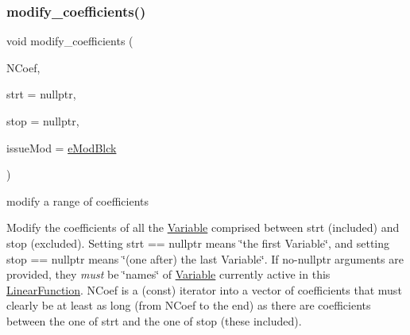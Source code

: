 \subsubsection{\texorpdfstring{modify\+\_\+coefficients()}{modify\_coefficients()}\hspace{0.1cm}{\footnotesize\ttfamily [4/4]}}
{\footnotesize\ttfamily void modify\+\_\+coefficients (\begin{DoxyParamCaption}\item[{\mbox{\hyperlink{class_s_m_spp__di__unipi__it_1_1_linear_function_a9e665512d3a7f7aae5031e99c675cc11}{c\+\_\+v\+\_\+coeff\+\_\+it}}}]{N\+Coef,  }\item[{const \mbox{\hyperlink{class_s_m_spp__di__unipi__it_1_1_variable}{Variable}} $\ast$}]{strt = {\ttfamily nullptr},  }\item[{const \mbox{\hyperlink{class_s_m_spp__di__unipi__it_1_1_variable}{Variable}} $\ast$}]{stop = {\ttfamily nullptr},  }\item[{\mbox{\hyperlink{group___modification___t_y_p_e_s_ga544246d8c462e9a2d817c2c30797968f}{c\+\_\+\+Mod\+Param}}}]{issue\+Mod = {\ttfamily \mbox{\hyperlink{group___modification___t_y_p_e_s_gga48fddcdd03a03f49b7e389ca1ed938d4a21b14b26b1c0093a0905f6fc010bad29}{e\+Mod\+Blck}}} }\end{DoxyParamCaption})\hspace{0.3cm}{\ttfamily [inline]}}



modify a range of coefficients 

Modify the coefficients of all the \mbox{\hyperlink{class_s_m_spp__di__unipi__it_1_1_variable}{Variable}} comprised between strt (included) and stop (excluded). Setting strt == nullptr means \char`\"{}the first
\+Variable\char`\"{}, and setting stop == nullptr means \char`\"{}(one after) the last
\+Variable\char`\"{}. If no-\/nullptr arguments are provided, they {\itshape must} be \char`\"{}names\char`\"{} of \mbox{\hyperlink{class_s_m_spp__di__unipi__it_1_1_variable}{Variable}} currently active in this \mbox{\hyperlink{class_s_m_spp__di__unipi__it_1_1_linear_function}{Linear\+Function}}. N\+Coef is a (const) iterator into a vector of coefficients that must clearly be at least as long (from N\+Coef to the end) as there are coefficients between the one of strt and the one of stop (these included). \mbox{\label{class_s_m_spp__di__unipi__it_1_1_linear_function_a0cb7093b112bfafe0b6d2b44f42fcc5a}} 
